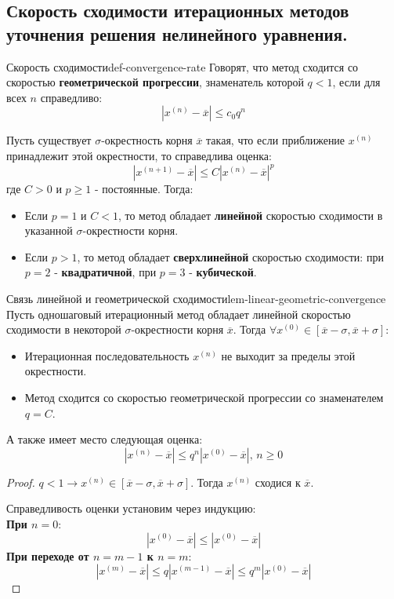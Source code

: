 \documentclass[14pt]{extarticle}
\begin{document}
\clearpage
\subsection{Скорость сходимости итерационных методов уточнения решения нелинейного уравнения.}

    \begin{definition}{Скорость сходимости}{def-convergence-rate}
        Говорят, что метод сходится со скоростью \textbf{геометрической прогрессии}, знаменатель которой $q < 1$, если для всех $n$ справедливо:
        $$|x^{(n)} - \overline{x}| \leq c_{0}q^{n}$$

        Пусть существует $\sigma$-окрестность корня $\overline{x}$ такая, что если приближение $x^{(n)}$ принадлежит этой окрестности, то справедлива оценка:
        $$|x^{(n + 1)} - \overline{x}| \leq C|x^{(n)} - \overline{x}|^{p}$$
        где $C > 0$ и $p \geq 1$ - постоянные. Тогда:
        
        \begin{itemize}
            \item Если $p = 1$ и $C < 1$, то метод обладает \textbf{линейной} скоростью сходимости в указанной $\sigma$-окрестности корня.
            \item Если $p > 1$, то метод обладает \textbf{сверхлинейной} скоростью сходимости: при $p = 2$ - \textbf{квадратичной}, при $p = 3$ - \textbf{кубической}.
        \end{itemize}
    \end{definition}

    \begin{lemma}{Связь линейной и геометрической сходимости}{lem-linear-geometric-convergence}
        Пусть одношаговый итерационный метод обладает линейной скоростью сходимости в некоторой $\sigma$-окрестности корня $\overline{x}$. Тогда $\forall x^{(0)} \in [\overline{x} - \sigma, \overline{x} + \sigma]$: 
        \begin{itemize}
            \item Итерационная последовательность $x^{(n)}$ не выходит за пределы  этой окрестности.
            \item Метод сходится со скоростью геометрической прогрессии со знаменателем $q = C$.
        \end{itemize}
        А также имеет место следующая оценка:
        $$|x^{(n)} - \overline{x}| \leq q^{n}|x^{(0)} - \overline{x}| \text{, } n \geq 0$$
    
        \begin{proof}
            $q < 1 \rightarrow x^{(n)} \in [\overline{x} - \sigma, \overline{x} + \sigma]$. Тогда $x^{(n)}$ сходися к $\overline{x}$.

            Справедливость оценки установим через индукцию:\\
            \textbf{При $n = 0$}: 
            $$|x^{(0)} - \overline{x}| \leq |x^{(0)} - \overline{x}|$$
            \textbf{При переходе от $n = m - 1$ к $n = m$}:
            $$|x^{(m)} - \overline{x}| \leq q|x^{(m-1)} - \overline{x}| \leq q^{m}|x^{(0)} - \overline{x}|$$
        \end{proof}
    \end{lemma}
\end{document}
